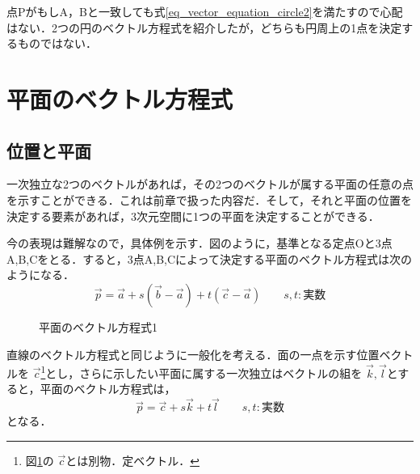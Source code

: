 \documentclass[dvipdfmx]{jsarticle}
\begin{document}
    点PがもしA，Bと一致しても式\eqref{eq_vector_equation_circle2}を満たすので心配はない．2つの円のベクトル方程式を紹介したが，どちらも円周上の1点を決定するものではない．

    \section{平面のベクトル方程式}
    \subsection{位置と平面}
    一次独立な2つのベクトルがあれば，その2つのベクトルが属する平面の任意の点を示すことができる．これは前章で扱った内容だ．そして，それと平面の位置を決定する要素があれば，3次元空間に1つの平面を決定することができる．

    今の表現は難解なので，具体例を示す．図のように，基準となる定点Oと3点A,B,Cをとる．すると，3点A,B,Cによって決定する平面のベクトル方程式は次のようになる．
    \[
    \vec{p}=\vec{a} + s(\vec{b}-\vec{a})+t(\vec{c}-\vec{a})\qquad s,t:\text{実数}
    \]

    \begin{figure}[htbp]\centering
        \caption{平面のベクトル方程式1}
        \label{tikz_vector_equation_plane1}
    \end{figure}

    直線のベクトル方程式と同じように一般化を考える．面の一点を示す位置ベクトルを \(\vec{c}\)\footnote{図\ref{tikz_vector_equation_plane1}の \(\vec{c}\)とは別物．定ベクトル．}とし，さらに示したい平面に属する一次独立はベクトルの組を \(\vec{k},\vec{l}\)とすると，平面のベクトル方程式は，
    \begin{equation}
        \vec{p} =\vec{c} +s\vec{k}+t\vec{l}\qquad s,t:\text{実数}
        \label{eq_vector_equation_plane1}
    \end{equation}
    となる．
\end{document}
